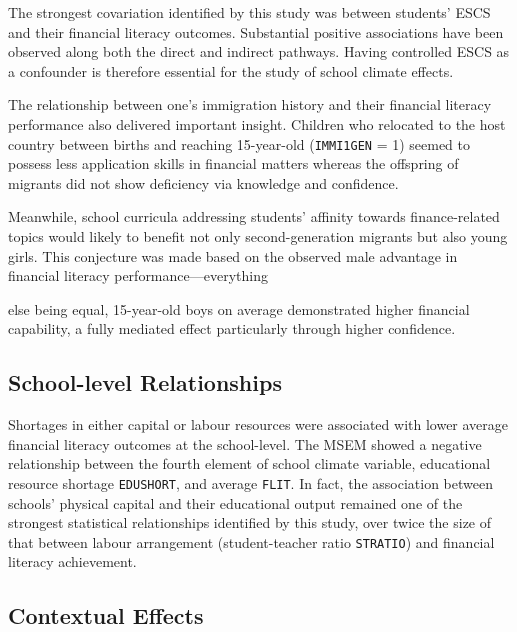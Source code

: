 The strongest covariation identified by this study was between students' ESCS and their financial literacy outcomes. Substantial positive associations have been observed along both the direct and indirect pathways. Having controlled ESCS as a confounder is therefore essential for the study of school climate effects.

The relationship between one's immigration history and their financial literacy performance also delivered important insight. Children who relocated to the host country between births and reaching 15-year-old (\texttt{IMMI1GEN} = 1) seemed to possess less application skills in financial matters whereas the offspring of migrants did not show deficiency via knowledge and confidence.

Meanwhile, school curricula addressing students' affinity towards finance-related topics would likely to benefit not only second-generation migrants but also young girls. This conjecture was made based on the observed male advantage in financial literacy performance---everything





\noindent else being equal, 15-year-old boys on average demonstrated higher financial capability, a fully mediated effect particularly through higher confidence.



\subsection{School-level Relationships}

Shortages in either capital or labour resources were associated with lower average financial literacy outcomes at the school-level. The MSEM showed a negative relationship between the fourth element of school climate variable, educational resource shortage \texttt{EDUSHORT}, and average \texttt{FLIT}. In fact, the association between schools' physical capital and their educational output remained one of the strongest statistical relationships identified by this study, over twice the size of that between labour arrangement (student-teacher ratio \texttt{STRATIO}) and financial literacy achievement.

\subsection{Contextual Effects}

